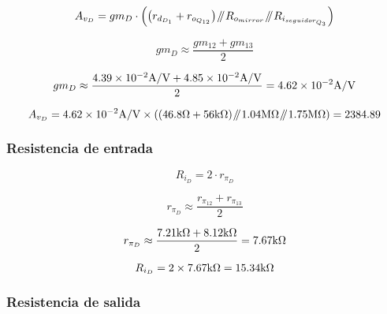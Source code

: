 \begin{equation}
A_{v_{D}} = gm_{D} \cdot \left( \left(  r_{d_{D_{1}}} + r_{o_{Q_{12}}} \right) \parallelresistors  R_{o_{mirror}} \parallelresistors R_{i_{seguidor_{Q_{3}}}} \right)
\end{equation}


\begin{equation}
gm_{D} \approx \frac{gm_{12} + gm_{13}}{2}
\end{equation}


\begin{equation*}
gm_{D} \approx \frac{\num{4.39E-2} \si[per-mode=symbol]{\ampere\per\volt} + \num{4.85E-2} \si[per-mode=symbol]{\ampere\per\volt}}{2} = \num{4.62e-2} \si[per-mode=symbol]{\ampere\per\volt}
\end{equation*}


\begin{equation*}
A_{v_{D}} = \num{4.62e-2} \si[per-mode=symbol]{\ampere\per\volt} \times \left( \left( 46.8 \si[per-mode=symbol]{\ohm}  + 56 \si[per-mode=symbol]{\kilo\ohm} \right) \parallelresistors 1.04 \si[per-mode=symbol]{\mega\ohm} \parallelresistors 1.75 \si[per-mode=symbol]{\mega\ohm}  \right) = 2384.89
\end{equation*}

\subsubsection{Resistencia de entrada}

\begin{equation}
R_{i_{D}} = 2 \cdot r_{\pi_{D}}
\end{equation}

\begin{equation}
r_{\pi_{D}} \approx \frac{r_{\pi_{12}} + r_{\pi_{13}}}{2}
\end{equation}

\begin{equation*}
r_{\pi_{D}} \approx \frac{7.21 \si[per-mode=symbol]{\kilo\ohm} + 8.12 \si[per-mode=symbol]{\kilo\ohm}}{2} = 7.67 \si[per-mode=symbol]{\kilo\ohm}
\end{equation*}

\begin{equation*}
R_{i_{D}} = 2 \times 7.67 \si[per-mode=symbol]{\kilo\ohm} = 15.34 \si[per-mode=symbol]{\kilo\ohm}
\end{equation*}



\subsubsection{Resistencia de salida}


